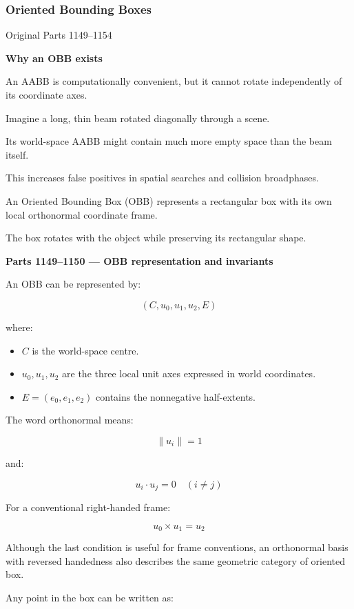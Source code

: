 \subsubsection{Oriented Bounding Boxes}\label{oriented-bounding-boxes}

Original Parts 1149--1154

\textbf{Why an OBB exists}

An AABB is computationally convenient, but it cannot rotate independently of its coordinate axes.

Imagine a long, thin beam rotated diagonally through a scene.

Its world-space AABB might contain much more empty space than the beam itself.

This increases false positives in spatial searches and collision broadphases.

An Oriented Bounding Box (OBB) represents a rectangular box with its own local orthonormal coordinate frame.

The box rotates with the object while preserving its rectangular shape.

\textbf{Parts 1149--1150 --- OBB representation and invariants}

An OBB can be represented by:

\[
(C,u_0,u_1,u_2,E)
\]

where:

\begin{itemize}
\tightlist
\item
  \(C\) is the world-space centre.
\item
  \(u_0,u_1,u_2\) are the three local unit axes expressed in world coordinates.
\item
  \(E=(e_0,e_1,e_2)\) contains the nonnegative half-extents.
\end{itemize}

The word orthonormal means:

\[
\boxed{\|u_i\|=1}
\]

and:

\[
\boxed{u_i\cdot u_j=0\quad(i\ne j)}
\]

For a conventional right-handed frame:

\[
u_0\times u_1=u_2
\]

Although the last condition is useful for frame conventions, an orthonormal basis with reversed handedness also describes the same geometric category of oriented box.

Any point in the box can be written as:

